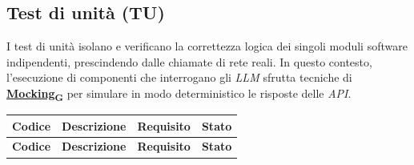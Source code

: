 \documentclass[12pt, a4paper]{article}
\newcommand{\urlglossario}{https://skynetunigroup.github.io/Code_Guardian/Documentazione/PB/glossario_v2.0.0.pdf} %
\newcommand{\glo}[2]{\href{\urlglossario\#nameddest=#2}{#1\textsubscript{G}}}
\newlength{\LargColVal} %
\begin{document}
\subsection{Test di unità (TU)}
I test di unità isolano e verificano la correttezza logica dei singoli moduli software indipendenti, prescindendo dalle chiamate di rete reali. In questo contesto, l'esecuzione di componenti che interrogano gli \textit{LLM} sfrutta tecniche di \textbf{\glo{Mocking}{mocking}} per simulare in modo deterministico le risposte delle \textit{API}.

\renewcommand{\arraystretch}{1.3}
\begin{xltabular}{\textwidth}{|c|X|C{\LargColVal}|C{\LargColVal}|}
    \hline
    \textbf{Codice} & \textbf{Descrizione} & \textbf{Requisito} & \textbf{Stato} \\ \hline
    \endfirsthead

    \hline
    \textbf{Codice} & \textbf{Descrizione} & \textbf{Requisito} & \textbf{Stato} \\ \hline
    \endhead


\end{xltabular}
\end{document}
